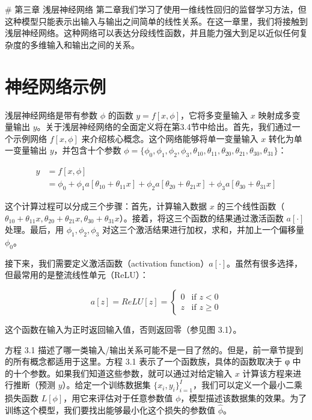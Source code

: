 # 第三章 浅层神经网络
第二章我们学习了使用一维线性回归的监督学习方法，但这种模型只能表示出输入与输出之间简单的线性关系。在这一章里，我们将接触到浅层神经网络。这种网络可以表达分段线性函数，并且能力强大到足以近似任何复杂度的多维输入和输出之间的关系。
\section{神经网络示例}
浅层神经网络是带有参数 \(\phi\) 的函数 \(y = f[x, \phi]\)，它将多变量输入 \(x\) 映射成多变量输出 \(y\)。关于浅层神经网络的全面定义将在第3.4节中给出。首先，我们通过一个示例网络 \(f[x, \phi]\) 来介绍核心概念。这个网络能够将单一变量输入 \(x\) 转化为单一变量输出 \(y\)，并包含十个参数 \(\phi = \{\phi_0, \phi_1, \phi_2, \phi_3, \theta_{10}, \theta_{11}, \theta_{20}, \theta_{21}, \theta_{30}, \theta_{31}\}\)：


\begin{align}
y &= f[x, \phi] \\ 
&= \phi_0 + \phi_1a[\theta_{10} + \theta_{11}x] + \phi_2a[\theta_{20} + \theta_{21}x] + \phi_3a[\theta_{30} + \theta_{31}x] \tag{3.1}
\end{align}


这个计算过程可以分成三个步骤：首先，计算输入数据 \(x\) 的三个线性函数（\(\theta_{10} + \theta_{11}x, \theta_{20} + \theta_{21}x, \theta_{30} + \theta_{31}x\)）。接着，将这三个函数的结果通过激活函数 \(a[\cdot]\) 处理。最后，用 \(\phi_1, \phi_2, \phi_3\) 对这三个激活结果进行加权，求和，并加上一个偏移量 \(\phi_0\)。

接下来，我们需要定义激活函数（activation function）\(a[\cdot]\)。虽然有很多选择，但最常用的是整流线性单元（ReLU）：

\[
a[z] = ReLU[z] = 
\begin{cases}
0 & \text{if } z < 0 \\
z & \text{if } z \geq 0
\end{cases} \tag{3.2}
\]

这个函数在输入为正时返回输入值，否则返回零（参见图 3.1）。

方程 3.1 描述了哪一类输入/输出关系可能不是一目了然的。但是，前一章节提到的所有概念都适用于这里。方程 3.1 表示了一个函数族，具体的函数取决于 φ 中的十个参数。如果我们知道这些参数，就可以通过对给定输入 \(x\) 计算该方程来进行推断（预测 \(y\)）。给定一个训练数据集 \(\{{x_i,y_i}\}^I_{i=1}\)，我们可以定义一个最小二乘损失函数 \(L[\phi]\)，用它来评估对于任意参数值 \(\phi\)，模型描述该数据集的效果。为了训练这个模型，我们要找出能够最小化这个损失的参数值 \(\hat \phi\)。


